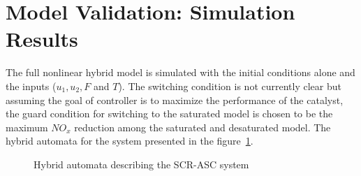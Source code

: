 \newpage
\section{Model Validation: Simulation Results}

The full nonlinear hybrid model is simulated with the initial conditions alone and the inputs ($u_1, u_2, F$ and $T$). The switching condition is not currently clear but assuming the goal of controller is to maximize the performance of the catalyst, the guard condition for switching to the saturated model is chosen to be the maximum $NO_x$ reduction among the saturated and desaturated model. The hybrid automata for the system presented in the figure~\ref{fig::hybrid_automata}.

\begin{figure}[H]
        \centering
        \caption{Hybrid automata describing the SCR-ASC system}
        \label{fig::hybrid_automata}
\end{figure}



